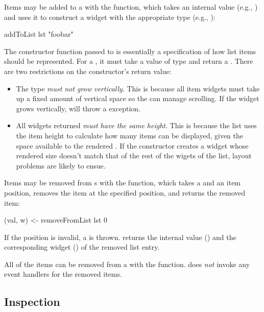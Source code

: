 Items may be added to a  with the  function,
which takes an internal value (e.g., ) and uses it to
construct a widget with the appropriate type (e.g., ):

\begin{haskellcode}
 addToList lst "foobar"
\end{haskellcode}

The constructor function passed to  is essentially a
specification of how list items should be represented.  For a , it must take a value of type  and return a .  There are two restrictions on the constructor's return value:

\begin{itemize}
\item The  type \textit{must not grow vertically}.  This
  is because all  item widgets must take up a fixed amount of
  vertical space so the  can manage scrolling.  If the widget
  grows vertically,  will throw a 
  exception.
\item All widgets returned \textit{must have the same height}.  This
  is because the list uses the item height to calculate how many items
  can be displayed, given the space available to the rendered
  .  If the constructor creates a widget whose rendered size
  doesn't match that of the rest of the wigets of the list, layout
  problems are likely to ensue.
\end{itemize}

Items may be removed from s with the 
function, which takes a  and an item position,
removes the item at the specified position, and returns the removed
item:

\begin{haskellcode}
 (val, w) <- removeFromList lst 0
\end{haskellcode}

If the position is invalid, a  is thrown.
 returns the internal value () and the
corresponding widget () of the removed list entry.

All of the items can be removed from a  with the
 function.   does \textit{not} invoke any
event handlers for the removed items.

\subsection{ Inspection}

